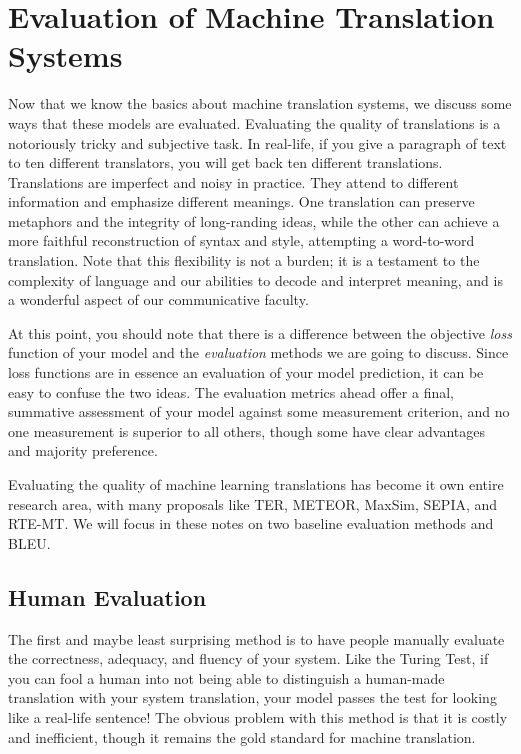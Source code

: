 \documentclass{tufte-handout}
\begin{document}
\section{Evaluation of Machine Translation Systems}
Now that we know the basics about machine translation systems, we discuss some ways that these models are evaluated. Evaluating the quality of translations is a notoriously tricky and subjective task. In real-life, if you give a paragraph of text to ten different translators, you will get back ten different translations. Translations are imperfect and noisy in practice. They attend to different information and emphasize different meanings. One translation can preserve metaphors and the integrity of long-randing ideas, while the other can achieve a more faithful reconstruction of syntax and style, attempting a word-to-word translation.  Note that this flexibility is not a burden; it is a testament to the complexity of language and our abilities to decode and interpret meaning, and is a wonderful aspect of our communicative faculty.

At this point, you should note that there is a difference between the objective \textit{loss} function of your model and the \textit{evaluation} methods we are going to discuss. Since loss functions are in essence an evaluation of your model prediction, it can be easy to confuse the two ideas. The evaluation metrics ahead offer a final, summative assessment of your model against some measurement criterion, and no one measurement is superior to all others, though some have clear advantages and majority preference.

Evaluating the quality of machine learning translations has become it own entire research area, with many proposals like TER, METEOR, MaxSim, SEPIA, and RTE-MT. We will focus in these notes on two baseline evaluation methods and BLEU.

\subsection{Human Evaluation}
The first and maybe least surprising method is to have people manually evaluate the correctness, adequacy, and fluency of your system. Like the Turing Test, if you can fool a human into not being able to distinguish a human-made translation with your system translation, your model passes the test for looking like a real-life sentence! The obvious problem with this method is that it is costly and inefficient, though it remains the gold standard for machine translation.
\end{document}
